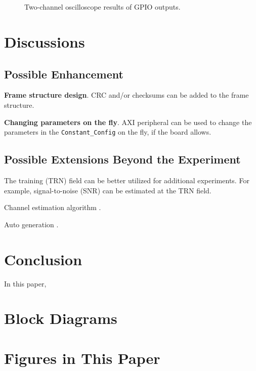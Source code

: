 \documentclass[journal,twoside]{IEEEtran}
\begin{document}


    \begin{figure*}[t]
      \centering
      \\
      \\
      \caption{Two-channel oscilloscope results of GPIO outputs.}
      \label{fig:scope}
    \end{figure*}

  \section{Discussions}

    \subsection{Possible Enhancement}

      \textbf{Frame structure design}.
      CRC and/or checksums can be added to the frame structure.

      \textbf{Changing parameters on the fly}.
      AXI peripheral \cite{xilinx:pg127} can be used to change the parameters in the \texttt{Constant\_Config} on the fly,
      if the board allows.

    \subsection{Possible Extensions Beyond the Experiment}

      The training (TRN) field can be better utilized for additional experiments.
      For example, signal-to-noise (SNR) can be estimated at the TRN field.

      Channel estimation algorithm \cite{zhao2023ompl,you2023beam}.

      Auto generation \cite{zhao2023automatic}.

  \section{Conclusion}

    In this paper,


  \appendices

  \section{Block Diagrams}

  \section{Figures in This Paper}

  
  
\end{document}
